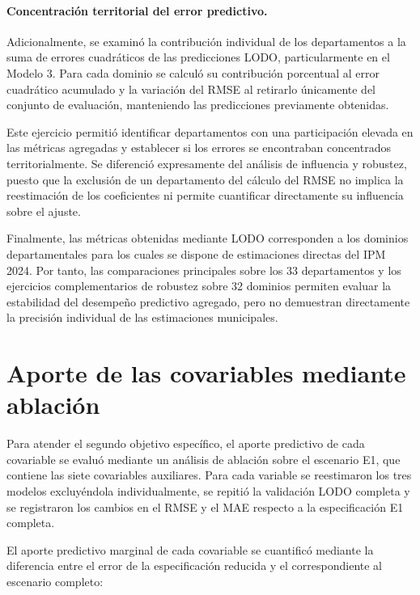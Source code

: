 \paragraph{Concentración territorial del error predictivo.}

Adicionalmente, se examinó la contribución individual de los departamentos a la suma de errores cuadráticos de las predicciones LODO, particularmente en el Modelo 3. Para cada dominio se calculó su contribución porcentual al error cuadrático acumulado y la variación del RMSE al retirarlo únicamente del conjunto de evaluación, manteniendo las predicciones previamente obtenidas.

Este ejercicio permitió identificar departamentos con una participación elevada en las métricas agregadas y establecer si los errores se encontraban concentrados territorialmente. Se diferenció expresamente del análisis de influencia y robustez, puesto que la exclusión de un departamento del cálculo del RMSE no implica la reestimación de los coeficientes ni permite cuantificar directamente su influencia sobre el ajuste.

Finalmente, las métricas obtenidas mediante LODO corresponden a los dominios departamentales para los cuales se dispone de estimaciones directas del IPM 2024. Por tanto, las comparaciones principales sobre los 33 departamentos y los ejercicios complementarios de robustez sobre 32 dominios permiten evaluar la estabilidad del desempeño predictivo agregado, pero no demuestran directamente la precisión individual de las estimaciones municipales.


\section{Aporte de las covariables mediante ablación}
\label{sec:met-ablacion}

Para atender el segundo objetivo específico, el aporte predictivo de cada covariable se evaluó mediante un análisis de ablación sobre el escenario E1, que contiene las siete covariables auxiliares. Para cada variable se reestimaron los tres modelos excluyéndola individualmente, se repitió la validación LODO completa y se registraron los cambios en el RMSE y el MAE respecto a la especificación E1 completa.

El aporte predictivo marginal de cada covariable se cuantificó mediante la diferencia entre el error de la especificación reducida y el correspondiente al escenario completo:

